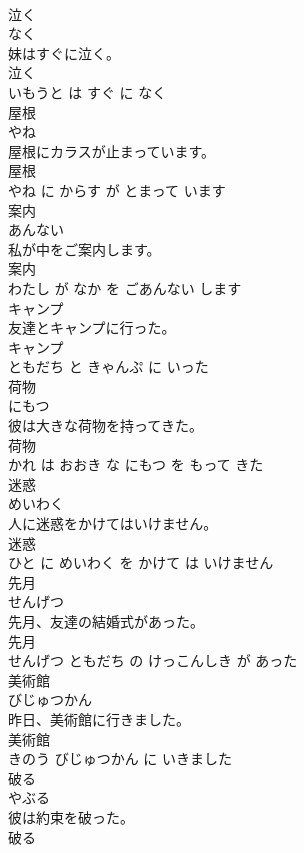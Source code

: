 \documentclass[8pt]{extreport}
\begin{document}
\begin{CJK}{UTF8}{min}
\\	泣く	
\\	なく			
\\	妹はすぐに泣く。	
\\	泣く 
\\	いもうと は すぐ に なく			
\\	屋根	
\\	やね			
\\	屋根にカラスが止まっています。	
\\	屋根 
\\	やね に からす が とまって います			
\\	案内	
\\	あんない			
\\	私が中をご案内します。	
\\	案内 
\\	わたし が なか を ごあんない します			
\\	キャンプ	
\\	友達とキャンプに行った。	
\\	キャンプ 
\\	ともだち と きゃんぷ に いった			
\\	荷物	
\\	にもつ			
\\	彼は大きな荷物を持ってきた。	
\\	荷物 
\\	かれ は おおき な にもつ を もって きた			
\\	迷惑	
\\	めいわく			
\\	人に迷惑をかけてはいけません。	
\\	迷惑 
\\	ひと に めいわく を かけて は いけません			
\\	先月	
\\	せんげつ			
\\	先月、友達の結婚式があった。	
\\	先月 
\\	せんげつ ともだち の けっこんしき が あった			
\\	美術館	
\\	びじゅつかん			
\\	昨日、美術館に行きました。	
\\	美術館 
\\	きのう びじゅつかん に いきました			
\\	破る	
\\	やぶる			
\\	彼は約束を破った。	
\\	破る 

\end{CJK}
\end{document}
